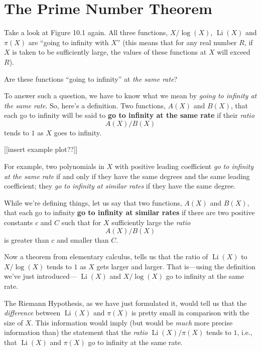 \documentclass[11pt,draft]{article}
\DeclareMathOperator{\Li}{Li}
\theoremstyle{plain}
\theoremstyle{definition}
\numberwithin{equation}{section}
\numberwithin{figure}{section}
\numberwithin{table}{section}
\begin{document}
\bigskip
 


\section{The Prime Number Theorem}
  
Take a look at Figure 10.1 again.  All three functions, $X/\log(X)$,
$\Li(X)$ and $\pi(X)$ are ``going to infinity with $X$'' (this means
that for any real number $R$, if $X$ is taken to be sufficiently
large, the values of these functions at $X$ will exceed $R$).

Are these functions ``going to infinity'' at {\it the same rate}?

To answer such a question, we have to know what we mean by {\it going
  to infinity at the same rate}. So, here's a definition. Two
functions, $A(X)$ and $B(X)$, that each go to infinity will be said to
{\bf go to infinity at the same rate} if their {\it ratio}
$$A(X)/B(X)$$ 
tends to $1$ as $X$ goes to infinity.


[[insert example plot??]]

For example, two polynomials in $X$ with positive leading coefficient
{\it go to infinity at the same rate} if and only if they have the
same degrees and the same leading coefficient; they {\it go to
  infinity at similar rates} if they have the same degree.
    
While we're defining things, let us say that two functions, $A(X)$
and $B(X)$, that each go to infinity {\bf go to infinity at
similar rates} if there are two positive constants $c$ and $C$
such that for $X$ sufficiently large the {\it ratio}
$$
      A(X)/B(X)
$$
is greater than $c$ and smaller than $C$.
    
Now a theorem from elementary calculus, tells us that the ratio of
$\Li(X)$ to $X/\log(X)$ tends to $1$ as $X$ gets larger and larger.
That is---using the definition we've just introduced--- $\Li(X)$ and
$X/\log(X)$ go to infinity at the same rate.
  
The Riemann Hypothesis, as we have just formulated it, would tell us
that the {\it difference} between $\Li(X)$ and $\pi(X)$ is pretty small
in comparison with the size of $X$. This information would imply (but
would be {\it much} more precise information than) the statement that
the {\it ratio} $\Li(X)/\pi(X)$ tends to $1$, i.e., that $\Li(X)$ and
$\pi(X)$ go to infinity at the same rate.
\end{document}
